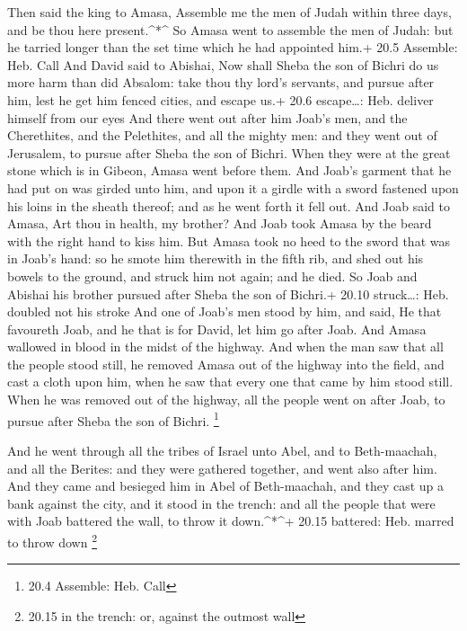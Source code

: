  Then said the king to Amasa, Assemble me the men of Judah
within three days, and be thou here present.\^{}*\^{}  So
Amasa went to assemble the men of Judah: but he tarried longer than the
set time which he had appointed him.+ 20.5 Assemble: Heb. Call
 And David said to Abishai, Now shall Sheba the son of
Bichri do us more harm than did Absalom: take thou thy lord's servants,
and pursue after him, lest he get him fenced cities, and escape us.+
20.6 escape\ldots: Heb. deliver himself from our eyes  And
there went out after him Joab's men, and the Cherethites, and the
Pelethites, and all the mighty men: and they went out of Jerusalem, to
pursue after Sheba the son of Bichri.  When they were at the
great stone which is in Gibeon, Amasa went before them. And Joab's
garment that he had put on was girded unto him, and upon it a girdle
with a sword fastened upon his loins in the sheath thereof; and as he
went forth it fell out.  And Joab said to Amasa, Art thou in
health, my brother? And Joab took Amasa by the beard with the right hand
to kiss him.  But Amasa took no heed to the sword that was
in Joab's hand: so he smote him therewith in the fifth rib, and shed out
his bowels to the ground, and struck him not again; and he died. So Joab
and Abishai his brother pursued after Sheba the son of Bichri.+ 20.10
struck\ldots: Heb. doubled not his stroke  And one of
Joab's men stood by him, and said, He that favoureth Joab, and he that
is for David, let him go after Joab.  And Amasa wallowed in
blood in the midst of the highway. And when the man saw that all the
people stood still, he removed Amasa out of the highway into the field,
and cast a cloth upon him, when he saw that every one that came by him
stood still.  When he was removed out of the highway, all
the people went on after Joab, to pursue after Sheba the son of Bichri.
\footnote{20.4 Assemble: Heb. Call}

 And he went through all the tribes of Israel unto Abel,
and to Beth-maachah, and all the Berites: and they were gathered
together, and went also after him.  And they came and
besieged him in Abel of Beth-maachah, and they cast up a bank against
the city, and it stood in the trench: and all the people that were with
Joab battered the wall, to throw it down.\^{}*\^{}+ 20.15 battered: Heb.
marred to throw down \footnote{20.15 in the trench: or, against the
  outmost wall}

